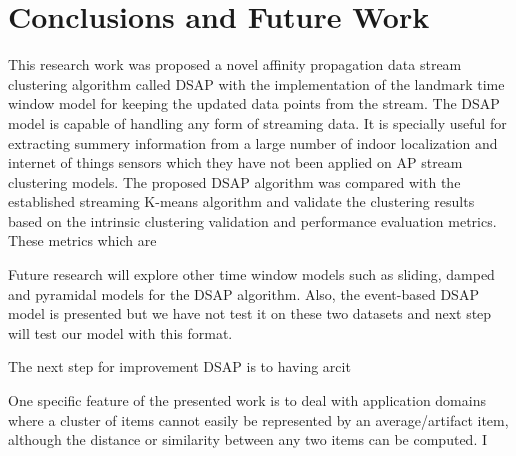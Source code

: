 \setlength{\parindent}{2em}

% 
\chapter{Conclusions and Future Work}

This research work was proposed a novel affinity propagation data stream clustering algorithm called DSAP with the implementation of the landmark time window model for keeping the updated data points from the stream. The DSAP model is capable of handling any form of streaming data. It is specially useful for extracting summery information from a large number of indoor localization and internet of things sensors which they have not been applied on AP stream clustering models.
The proposed DSAP algorithm was compared with the established streaming K-means algorithm and validate the clustering results based on the intrinsic clustering validation and performance evaluation metrics. These metrics which are 

Future research will explore other time window models such as sliding, damped and pyramidal models for the DSAP algorithm. Also, the event-based DSAP model is presented but we have not test it on these two datasets and next step will test our model with this format.

The next step for improvement DSAP is to having arcit


One specific feature of the presented work is to deal with application domains where a cluster of items cannot easily be represented by an average/artifact item, although the distance or similarity between any two items can be computed. I




